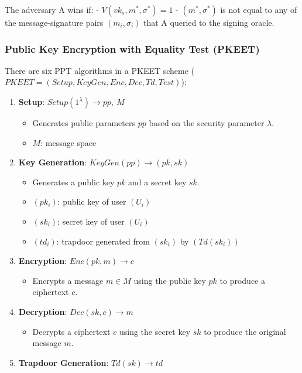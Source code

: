 \documentclass[
]{article}
\providecommand{\tightlist}{%
  \setlength{\itemsep}{0pt}\setlength{\parskip}{0pt}}
\begin{document}
The adversary A wins if: - \(V({vk}_s, m^*, \sigma^*) = 1\) -
\((m^*, \sigma^*)\) is not equal to any of the message-signature pairs
\((m_i, \sigma_i)\) that A queried to the signing oracle.

\hypertarget{public-key-encryption-with-equality-test-pkeet}{%
\subsubsection{Public Key Encryption with Equality Test
(PKEET)}\label{public-key-encryption-with-equality-test-pkeet}}

There are six PPT algorithms in a PKEET scheme
(\(PKEET = (Setup, KeyGen, Enc, Dec, Td,Test)\)):

\begin{enumerate}
\def\labelenumi{\arabic{enumi}.}
\tightlist
\item
  \textbf{Setup}: \(Setup(1^\lambda) \rightarrow pp,\ M\)

  \begin{itemize}
  \tightlist
  \item
    Generates public parameters \(pp\) based on the security parameter
    \(\lambda\).
  \item
    \(M\): message space
  \end{itemize}
\item
  \textbf{Key Generation}: \(KeyGen(pp) \rightarrow (pk, sk)\)

  \begin{itemize}
  \tightlist
  \item
    Generates a public key \(pk\) and a secret key \(sk\).
  \item
    \((pk_i)\): public key of user \((U_i)\)
  \item
    \((sk_i)\): secret key of user \((U_i)\)
  \item
    \((td_i)\): trapdoor generated from \((sk_i)\) by \((Td(sk_i))\)
  \end{itemize}
\item
  \textbf{Encryption}: \(Enc(pk, m) \rightarrow c\)

  \begin{itemize}
  \tightlist
  \item
    Encrypts a message \(m \in M\) using the public key \(pk\) to
    produce a ciphertext \(c\).
  \end{itemize}
\item
  \textbf{Decryption}: \(Dec(sk, c) \rightarrow m\)

  \begin{itemize}
  \tightlist
  \item
    Decrypts a ciphertext \(c\) using the secret key \(sk\) to produce
    the original message \(m\).
  \end{itemize}
\item
  \textbf{Trapdoor Generation}: \(Td(sk) \rightarrow td\)


\end{enumerate}
\end{document}
